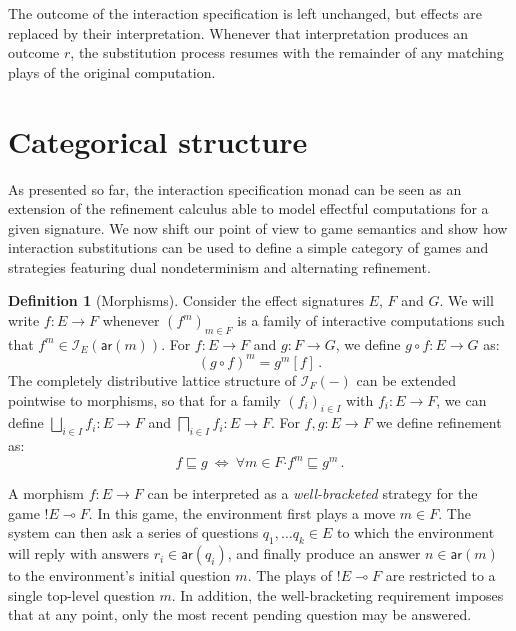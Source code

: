 \documentclass[11pt,oneside,draft]{book}
\theoremstyle{definition}
\newtheorem{definition}[theorem]{Definition}
\newcommand{\kw}[1]{\ensuremath{ \mathsf{#1} }}
\newcommand{\bdot}{\boldsymbol{\cdot}}
\begin{document}
The outcome of the interaction specification is left unchanged,
but effects are replaced by their interpretation.
Whenever that interpretation produces an outcome $r$,
the substitution process resumes with the remainder of any
matching plays of the original computation.


\section{Categorical structure} \label{sec:intm:cat} %

As presented so far,
the interaction specification monad
can be seen as an extension of the refinement calculus
able to model effectful computations
for a given signature.
We now shift our point of view to game semantics
and show how interaction substitutions
can be used to define a simple category of games and strategies
featuring dual nondeterminism and alternating refinement.

\begin{definition}[Morphisms]
Consider the effect signatures $E$, $F$ and $G$.
We will write $f : E \rightarrow F$
whenever $(f^m)_{m \in F}$ is a family of interactive computations
such that $f^m \in \mathcal{I}_E(\kw{ar}(m))$.
For $f : E \rightarrow F$ and $g : F \rightarrow G$,
we define $g \circ f : E \rightarrow G$ as:
\[ (g \circ f)^m = g^m[f] \,. \]
The completely distributive lattice structure
of $\mathcal{I}_F(-)$ can be extended pointwise
to morphisms,
so that for a family $(f_i)_{i \in I}$
with $f_i : E \rightarrow F$,
we can define
$\bigsqcup_{i \in I} f_i : E \rightarrow F$ and
$\bigsqcap_{i \in I} f_i : E \rightarrow F$.
For $f, g : E \rightarrow F$
we define refinement as:
\[
    f \sqsubseteq g \: \Leftrightarrow \:
    \forall m \in F \bdot f^m \sqsubseteq g^m \,.
\]
\end{definition}

A morphism $f : E \rightarrow F$
can be interpreted as a \emph{well-bracketed} strategy for the game
${!E} \multimap F$.
In this game,
the environment first plays a move $m \in F$.
The system can then ask a series of questions
$q_1, \ldots q_k \in E$
to which the environment will reply with
answers $r_i \in \kw{ar}(q_i)$,
and finally produce an answer $n \in \kw{ar}(m)$
to the environment's initial question $m$.
The plays of ${!E} \multimap F$
are restricted to a single top-level question $m$.
In addition, the well-bracketing requirement
imposes that at any point,
only the most recent pending question
may be answered.
\end{document}
